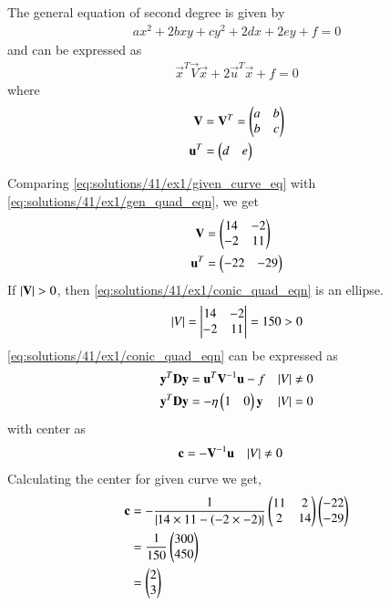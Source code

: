 The general equation of second degree is given by
\begin{align}
ax^2+2bxy+cy^2+2dx+2ey+f=0 \label{eq:solutions/41/ex1/gen_quad_eqn}
\end{align}
and can be expressed as
\begin{align}
\vec{x}^T\vec{V}\vec{x}+2\vec{u}^T\vec{x}+f=0 \label{eq:solutions/41/ex1/conic_quad_eqn}
\end{align}
where
\begin{align}
\mathbf{V} &= \mathbf{V}^T = \begin{pmatrix}a & b \\ b & c\end{pmatrix}
\\
\mathbf{u}^T &= \begin{pmatrix}d & e\end{pmatrix}
\end{align}

Comparing \eqref{eq:solutions/41/ex1/given_curve_eq} with \eqref{eq:solutions/41/ex1/gen_quad_eqn}, we get
\begin{align}
\mathbf{V} &= \begin{pmatrix}14  & -2 \\ -2 & 11\end{pmatrix}
\\
\mathbf{u}^T &= \begin{pmatrix}-22 & -29\end{pmatrix}
\end{align}
If $\left\vert\mathbf{V}\right\vert > 0$, then \eqref{eq:solutions/41/ex1/conic_quad_eqn} is an ellipse. 
\begin{align}
\left\vert V\right\vert = \begin{vmatrix}14 & -2 \\ -2 & 11\end{vmatrix} = 150 > 0 \label{eq:solutions/41/ex1/ellipse_proved_eq}
\end{align}
\eqref{eq:solutions/41/ex1/conic_quad_eqn} can be expressed as
\begin{align}
\label{eq:solutions/41/ex1/conic_simp_temp_nonparab_eq}
\mathbf{y}^T\mathbf{D}\mathbf{y} &=  \mathbf{u}^T\mathbf{V}^{-1}\mathbf{u} -f  &  \left\vert V\right\vert &\ne 0
\\
\mathbf{y}^T\mathbf{D}\mathbf{y} &=  -\eta\begin{pmatrix}1 & 0\end{pmatrix}\mathbf{y}   & \left\vert V\right\vert &= 0
\label{eq:solutions/41/ex1/conic_simp_temp_parab_eq}
\end{align}
with center as 
\begin{align}
    \mathbf{c} &= - \mathbf{V}^{-1}\mathbf{u} & \left\vert V\right\vert &\ne 0
\end{align}
Calculating the center for given curve we get,
\begin{align}
    \mathbf{c} &= - \frac{1}{\left\vert14\times11 - \left(-2\times-2\right)\right\vert}\begin{pmatrix}11  & 2 \\ 2 & 14\end{pmatrix}\begin{pmatrix}-22 \\ -29\end{pmatrix} \\
    &= \frac{1}{150}\begin{pmatrix}300 \\ 450\end{pmatrix} \\
    &= \begin{pmatrix}2 \\ 3\end{pmatrix}
\end{align}
